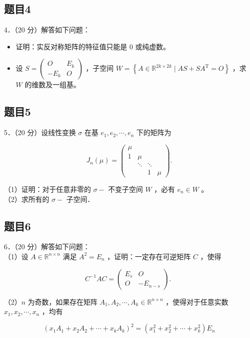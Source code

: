 \documentclass{article}
\begin{document}
\subsection{题目4}
4．（20 分）解答如下问题：

\begin{itemize}
  \item[（1）] 证明：实反对称矩阵的特征值只能是 0 或纯虚数。
  \item[（2）] 设 \(S=\left(\begin{array}{cc}O & E_{k} \\ -E_{k} & O\end{array}\right)\) ，子空间 \(W=\left\{A \in \mathbb{R}^{2 k \times 2 k} \mid A S+S A^{\mathrm{T}}=O\right\}\) ，求 \(W\) 的维数及一组基。
\end{itemize}

\subsection{题目5}
5．（20 分）设线性变换 \(\sigma\) 在基 \(e_{1}, e_{2}, \cdots, e_{n}\) 下的矩阵为

\[
J_{n}(\mu)=\left(\begin{array}{cccc}
\mu & & & \\
1 & \mu & & \\
& \ddots & \ddots & \\
& & 1 & \mu
\end{array}\right) .
\]

（1）证明：对于任意非零的 \(\sigma-\) 不变子空间 \(W\) ，必有 \(e_{n} \in W\) 。\\
（2）求所有的 \(\sigma-\) 子空间．

\subsection{题目6}
6．（20 分）解答如下问题：\\
（1）设 \(A \in \mathbb{R}^{n \times n}\) 满足 \(A^{2}=E_{n}\) ，证明：一定存在可逆矩阵 \(C\) ，使得

\[
C^{-1} A C=\left(\begin{array}{cc}
E_{s} & O \\
O & -E_{n-s}
\end{array}\right) \text {. }
\]

（2）\(n\) 为奇数，如果存在矩阵 \(A_{1}, A_{2}, \cdots, A_{k} \in \mathbb{R}^{n \times n}\) ，使得对于任意实数 \(x_{1}, x_{2}, \cdots, x_{n}\) ，均有

\[
\left(x_{1} A_{1}+x_{2} A_{2}+\cdots+x_{k} A_{k}\right)^{2}=\left(x_{1}^{2}+x_{2}^{2}+\cdots+x_{k}^{2}\right) E_{n}
\]
\end{document}
